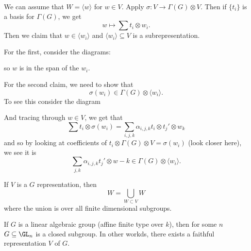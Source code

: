 \documentclass[12pt]{article}
\begin{document}
\begin{prf}
	We can assume that $W=\langle w\rangle$ for $w\in V$. Apply $\sigma:V\to \Gamma(G)\otimes V$. Then if $\{t_i\}$ is a 
	basis for $\Gamma(G)$, we get 
	\[w\mapsto\sum t_i\otimes w_i.\]
	Then we claim that $w\in\langle w_i\rangle$ and $\langle w_i\rangle\subseteq V$ is a subrepresentation.

	For the first, consider the diagrams:
	\begin{center}
	\end{center}
	so $w$ is in the span of the $w_i$.

	For the second claim, we need to show that 
	\[\sigma(w_i)\in\Gamma(G)\otimes\langle w_i\rangle.\]
	To see this consider the diagram 
	\begin{center}
	\end{center}
	And tracing through $w\in V$, we get that 
	\[\sum t_i\otimes\sigma(w_i)=\sum_{i,j,k}\alpha_{i,j,k}t_i\otimes t_j'\otimes w_k\]
	and so by looking at coefficients of $t_i\otimes \Gamma(G)\otimes V=\sigma(w_i)$ (look closer here), we see it is 
	\[\sum_{j,k}\alpha_{i,j,k}t_j'\otimes w-k\in\Gamma(G)\otimes\langle w_i\rangle.\]
\end{prf}
\begin{cor}
	If $V$ is a $G$ representation, then 
	\[W=\bigcup_{W\subset V}W\]
	where the union is over all finite dimensional subgroups.
\end{cor}
\begin{cor}
		If $G$ is a linear algebraic group (affine finite type over $k$), then for some $n$ $G\subseteq \GL_n$ is a closed subgroup.
		In other workds, there exists a faithful representation $V$ of $G$.
\end{cor}
\end{document}
